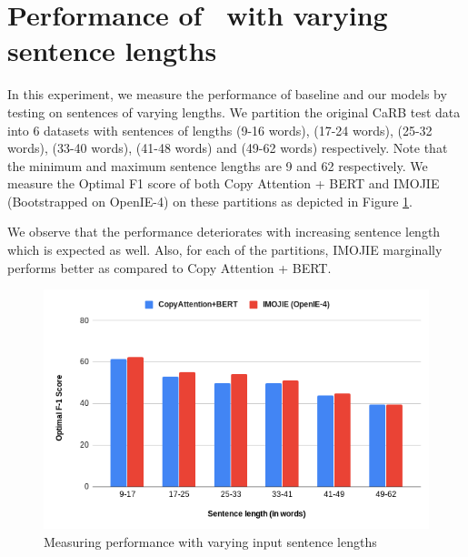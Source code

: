 
\section{Performance of \shortname\ with varying sentence lengths}
    In this experiment, we measure the performance of baseline and our models by testing on sentences of varying lengths. We partition the original CaRB test data into 6 datasets with sentences of lengths (9-16 words), (17-24 words), (25-32 words), (33-40 words), (41-48 words) and (49-62 words) respectively. Note that the minimum and maximum sentence lengths are 9 and 62 respectively. We measure the Optimal F1 score of both Copy Attention + BERT and IMOJIE (Bootstrapped on OpenIE-4) on these partitions as depicted in Figure \ref{fig1}. \newline

    We observe that the performance deteriorates with increasing sentence length which is expected as well. Also, for each of the partitions, IMOJIE marginally performs better as compared to Copy Attention + BERT.

    \begin{figure}[h]
    \begin{center}
    \advance\leftskip-3cm
    \advance\rightskip-3cm
    \includegraphics[keepaspectratio=true,scale=0.35]{images/imojie/Fig1.png}
    \caption{Measuring performance with varying input sentence lengths}
    \label{fig1}
    \end{center}
    \end{figure}
    
